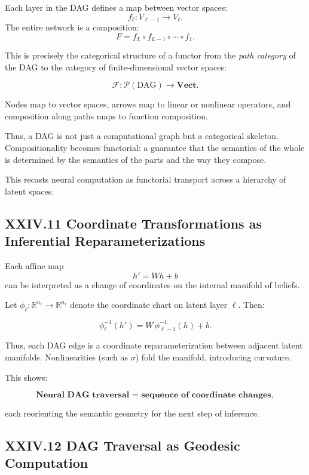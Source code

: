 \documentclass[12pt,letterpaper]{article}
\begin{document}
Each layer in the DAG defines a map between vector spaces:
\[
f_\ell : V_{\ell-1} \to V_\ell.
\]
The entire network is a composition:
\[
F = f_L \circ f_{L-1} \circ \cdots \circ f_1.
\]

This is precisely the categorical structure of a functor from the \emph{path category} of the DAG to the category of finite-dimensional vector spaces:

\[
\mathcal{F} : \mathcal{P}(\text{DAG}) \to \mathbf{Vect}.
\]

Nodes map to vector spaces, arrows map to linear or nonlinear operators, and composition along paths maps to function composition.

Thus, a DAG is not just a computational graph but a categorical skeleton. Compositionality becomes functorial: a guarantee that the semantics of the whole is determined by the semantics of the parts and the way they compose.

This recasts neural computation as functorial transport across a hierarchy of latent spaces.

\subsection{XXIV.11 Coordinate Transformations as Inferential Reparameterizations}

Each affine map
\[
h' = W h + b
\]
can be interpreted as a change of coordinates on the internal manifold of beliefs.

Let $\phi_\ell : \mathbb{R}^{n_\ell} \to \mathbb{R}^{n_\ell}$ denote the coordinate chart on latent layer $\ell$. Then:

\[
\phi_\ell^{-1}(h') = W\, \phi_{\ell-1}^{-1}(h) + b.
\]

Thus, each DAG edge is a coordinate reparameterization between adjacent latent manifolds.  
Nonlinearities (such as $\sigma$) fold the manifold, introducing curvature.

This shows:

\[
\textbf{Neural DAG traversal = sequence of coordinate changes},
\]

each reorienting the semantic geometry for the next step of inference.

\subsection{XXIV.12 DAG Traversal as Geodesic Computation}
\end{document}
